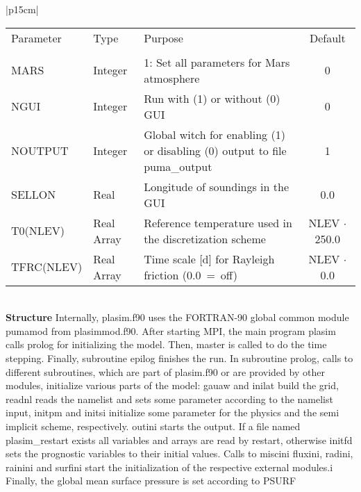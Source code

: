 \newpage 

\begin{center}
\begin{tabular}{|p{15cm}|}
\hline
\begin{center}
\begin{tabular}{l l p{5cm} c}
Parameter & Type & Purpose & Default \\
&&&\\
MARS     & Integer   & 1: Set all parameters for Mars atmosphere & 0 \\
NGUI     & Integer   & Run with (1) or without (0) GUI & 0 \\
NOUTPUT  & Integer   & Global witch for enabling (1) or disabling (0)
output to file {\file puma\_output} & 1 \\
SELLON & Real & Longitude of soundings in the GUI & 0.0 \\
T0(NLEV) & Real Array& Reference temperature used in the discretization scheme & NLEV
$\cdot$ 250.0 \\
TFRC(NLEV) & Real Array & Time scale [d] for Rayleigh friction (0.0~=~off)& NLEV
$\cdot$ 0.0
\end{tabular} 
\end{center}
\vspace{3mm} \\
\hline
\vspace{2mm} {\bf Structure} Internally, {\module plasim.f90}
uses the FORTRAN-90 global common module {\modu pumamod} from
{\module plasimmod.f90}. After starting MPI, the main program
{\sub plasim} calls {\sub prolog} for initializing the model.
Then, {\sub master} is called to do the time stepping.
Finally, subroutine {\sub epilog} finishes the run.
In subroutine {\sub prolog}, calls to different subroutines,
which are part of {\module plasim.f90} or are  provided by other
modules, initialize various parts of the model: {\sub gauaw}
and {\sub inilat} build  the grid, {\sub readnl} reads the namelist
and sets some parameter according to the namelist input,
{\sub initpm} and {\sub initsi} initialize  some parameter
for the physics and the semi implicit scheme, respectively.
{\sub outini} starts the output. If a file named
{\file plasim\_restart} exists all variables and arrays are read
by {\sub restart}, otherwise {\sub initfd} sets the prognostic variables
to their initial values.  Calls to {\sub miscini} {\sub fluxini},
{\sub radini}, {\sub rainini} and {\sub surfini}
start the initialization of the respective external modules.i
Finally, the global mean surface pressure is set according to PSURF

\end{tabular}
\end{center}
